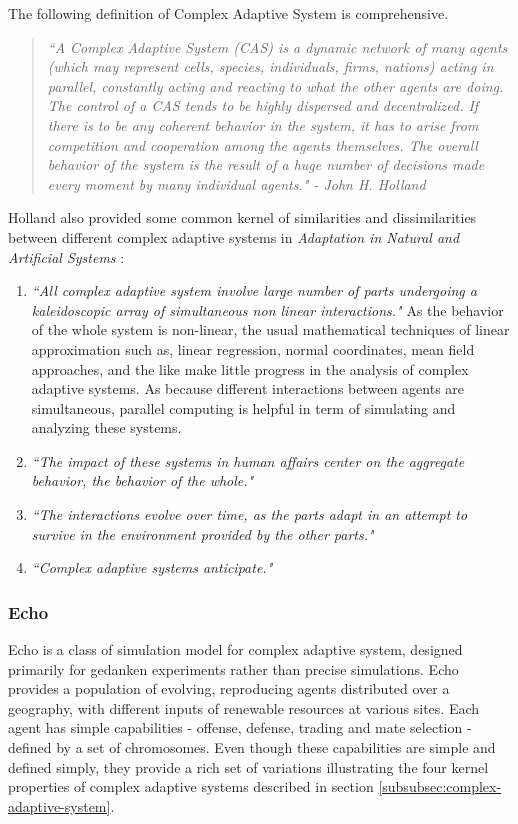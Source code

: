 \documentclass[letterpaper]{article}
\numberwithin{equation}{section}
\begin{document}
The following definition of Complex Adaptive System is comprehensive.

\begin{quote}
\textsl{``A Complex Adaptive System (CAS) is a dynamic network of many agents (which may represent cells, species, individuals, firms, nations) acting in parallel, constantly acting and reacting to what the other agents are doing. The control of a CAS tends to be highly dispersed and decentralized. If there is to be any coherent behavior in the system, it has to arise from competition and cooperation among the agents themselves. The overall behavior of the system is the result of a huge number of decisions made every moment by many individual agents." - John H. Holland}
\end{quote}

Holland also provided some common kernel of similarities and dissimilarities between different complex adaptive systems in \textsl{Adaptation in Natural and Artificial Systems} \cite{holland1975}:

\begin{enumerate}
	\item \textsl{``All complex adaptive system involve large number of parts undergoing a kaleidoscopic array of simultaneous non linear interactions."} As the behavior of the whole system is non-linear, the usual mathematical techniques of linear approximation such as, linear regression, normal coordinates, mean field approaches, and the like make little progress in the analysis of complex adaptive systems. As because different interactions between agents are simultaneous, parallel computing is helpful in term of simulating and analyzing these systems. 
	\item \textsl{``The impact of these systems in human affairs center on the aggregate behavior, the behavior of the whole."}
	\item \textsl{``The interactions evolve over time, as the parts adapt in an attempt to survive in the environment provided by the other parts."}
	\item \textsl{``Complex adaptive systems anticipate."}
\end{enumerate}

\subsubsection{Echo}
\label{subsubsec:echo}
Echo is a class of simulation model for complex adaptive system, designed primarily for gedanken experiments rather than precise simulations. Echo provides a population of evolving, reproducing agents distributed over a geography, with different inputs of renewable resources at various sites. Each agent has simple capabilities - offense, defense, trading and mate selection - defined by a set of chromosomes. Even though these capabilities are simple and defined simply, they provide a rich set of variations illustrating the four kernel properties of complex adaptive systems described in section \ref{subsubsec:complex-adaptive-system}.
\end{document}
